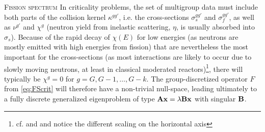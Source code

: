 \begin{remark}{\textsc{Fission spectrum}}
In criticality problems, the set of multigroup data must include both parts of the collision kernel
$\kappa^{gg'}$, i.e. the cross-sections $\sigma_s^{gg'}$ and $\sigma_f^{gg'}$, as well as $\nu^{g'}$ and
$\chi^g$ (neutron yield from inelastic scattering, $\eta$, is usually absorbed into $\sigma_s$). Because of the rapid
decay of $\chi(E)$ for low energies (as neutrons are mostly emitted with high energies from fission) that are
nevertheless the most important for the cross-sections (as most interactions are likely to occur due to slowly moving
neutrons, at least in classical moderated reactors)\footnote{cf.  and  and notice the
different scaling on the horizontal axis}, there will typically be $\chi^g = 0$ for $g = G,G-1,\ldots,G-k$. The
group-discretized operator $F$ from \eqref{eq:FScrit} will therefore have a non-trivial null-space, leading ultimately
to a fully discrete generalized eigenproblem of type $\mathbf{A}\mathbf{x} = \lambda\mathbf{B}\mathbf{x}$ with singular $\mathbf{B}$.
\end{remark}

